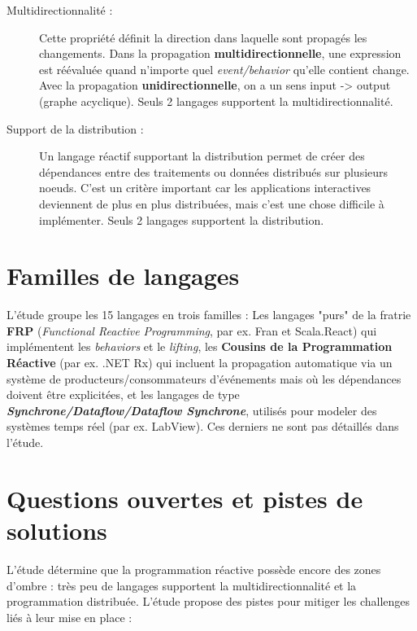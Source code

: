 \documentclass[10pt,final]{IEEEtran}
\begin{document}
\begin{description}
    \item[Multidirectionnalité :]
    Cette propriété définit la direction dans laquelle sont propagés les changements. Dans la propagation \textbf{multidirectionnelle}, une expression est réévaluée quand n'importe quel \textit{event/behavior} qu'elle contient change. Avec la propagation \textbf{unidirectionnelle}, on a un sens input -> output (graphe acyclique). Seuls 2 langages supportent la multidirectionnalité.
    
    \item[Support de la distribution :]
    Un langage réactif supportant la distribution permet de créer des dépendances entre des traitements ou données distribués sur plusieurs noeuds. C'est un critère important car les applications interactives deviennent de plus en plus distribuées, mais c'est une chose difficile à implémenter. Seuls 2 langages supportent la distribution.
\end{description}


\section{Familles de langages}

L'étude groupe les 15 langages en trois familles : Les langages "purs" de la fratrie \textbf{FRP} (\textit{Functional Reactive Programming}, par ex. Fran et Scala.React) qui implémentent les \textit{behaviors} et le \textit{lifting}, les \textbf{Cousins de la Programmation Réactive} (par ex. .NET Rx) qui incluent la propagation automatique via un système de producteurs/consommateurs d'événements mais où les dépendances doivent être explicitées, et les langages de type \textit{\textbf{Synchrone/Dataflow/Dataflow Synchrone}}, utilisés pour modeler des systèmes temps réel (par ex. LabView). Ces derniers ne sont pas détaillés dans l'étude.

\section{Questions ouvertes et pistes de solutions}
 
L'étude détermine que la programmation réactive possède encore des zones d'ombre : très peu de langages supportent la multidirectionnalité et la programmation distribuée. L'étude propose des pistes pour mitiger les challenges liés à leur mise en place :
\end{document}
